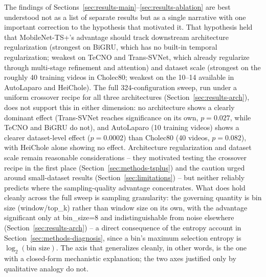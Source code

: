 \documentclass[preprint,12pt]{elsarticle}
\begin{document}
The findings of Sections~\ref{sec:results-main}--\ref{sec:results-ablation} are best understood not as a list of separate results but as a single narrative with one important correction to the hypothesis that motivated it. That hypothesis held that MobileNet-TS+'s advantage should track downstream architecture regularization (strongest on BiGRU, which has no built-in temporal regularization; weakest on TeCNO and Trans-SVNet, which already regularize through multi-stage refinement and attention) and dataset scale (strongest on the roughly 40 training videos in Cholec80; weakest on the 10--14 available in AutoLaparo and HeiChole). The full 324-configuration sweep, run under a uniform crossover recipe for all three architectures (Section~\ref{sec:results-arch}), does not support this in either dimension: no architecture shows a clearly dominant effect (Trans-SVNet reaches significance on its own, $p=0.027$, while TeCNO and BiGRU do not), and AutoLaparo (10 training videos) shows a clearer dataset-level effect ($p=0.0002$) than Cholec80 (40 videos, $p=0.082$), with HeiChole alone showing no effect. Architecture regularization and dataset scale remain reasonable considerations -- they motivated testing the crossover recipe in the first place (Section~\ref{sec:methods-tsplus}) and the caution urged around small-dataset results (Section~\ref{sec:limitations}) -- but neither reliably predicts where the sampling-quality advantage concentrates. What does hold cleanly across the full sweep is sampling granularity: the governing quantity is bin size (window/top\_k) rather than window size on its own, with the advantage significant only at bin\_size=8 and indistinguishable from noise elsewhere (Section~\ref{sec:results-arch}) -- a direct consequence of the entropy account in Section~\ref{sec:methods-diagnosis}, since a bin's maximum selection entropy is $\log_2(\text{bin size})$. The axis that generalizes cleanly, in other words, is the one with a closed-form mechanistic explanation; the two axes justified only by qualitative analogy do not.
\end{document}
